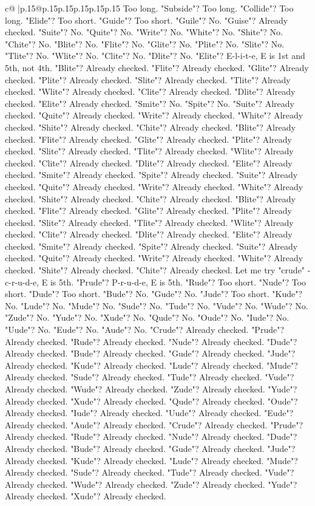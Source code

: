 \documentclass{article}
\begin{document}
{\begin{supertabular}{c@{$\;$}|p{.15\linewidth}@{}p{.15\linewidth}p{.15\linewidth}p{.15\linewidth}p{.15\linewidth}p{.15\linewidth}}
{{{Too long. "Subside"? Too long. "Collide"? Too long. "Elide"? Too short. "Guide"? Too short. "Guile"? No. "Guise"? Already checked. "Suite"? No. "Quite"? No. "Write"? No. "White"? No. "Shite"? No. "Chite"? No. "Blite"? No. "Flite"? No. "Glite"? No. "Plite"? No. "Slite"? No. "Tlite"? No. "Wlite"? No. "Clite"? No. "Dlite"? No. "Elite"? E{-}l{-}i{-}t{-}e, E is 1st and 5th, not 4th. "Blite"? Already checked. "Flite"? Already checked. "Glite"? Already checked. "Plite"? Already checked. "Slite"? Already checked. "Tlite"? Already checked. "Wlite"? Already checked. "Clite"? Already checked. "Dlite"? Already checked. "Elite"? Already checked. "Smite"? No. "Spite"? No. "Suite"? Already checked. "Quite"? Already checked. "Write"? Already checked. "White"? Already checked. "Shite"? Already checked. "Chite"? Already checked. "Blite"? Already checked. "Flite"? Already checked. "Glite"? Already checked. "Plite"? Already checked. "Slite"? Already checked. "Tlite"? Already checked. "Wlite"? Already checked. "Clite"? Already checked. "Dlite"? Already checked. "Elite"? Already checked. "Smite"? Already checked. "Spite"? Already checked. "Suite"? Already checked. "Quite"? Already checked. "Write"? Already checked. "White"? Already checked. "Shite"? Already checked. "Chite"? Already checked. "Blite"? Already checked. "Flite"? Already checked. "Glite"? Already checked. "Plite"? Already checked. "Slite"? Already checked. "Tlite"? Already checked. "Wlite"? Already checked. "Clite"? Already checked. "Dlite"? Already checked. "Elite"? Already checked. "Smite"? Already checked. "Spite"? Already checked. "Suite"? Already checked. "Quite"? Already checked. "Write"? Already checked. "White"? Already checked. "Shite"? Already checked. "Chite"? Already checked. Let me try "crude" {-} c{-}r{-}u{-}d{-}e, E is 5th. "Prude"? P{-}r{-}u{-}d{-}e, E is 5th. "Rude"? Too short. "Nude"? Too short. "Dude"? Too short. "Bude"? No. "Gude"? No. "Jude"? Too short. "Kude"? No. "Lude"? No. "Mude"? No. "Sude"? No. "Tude"? No. "Vude"? No. "Wude"? No. "Zude"? No. "Yude"? No. "Xude"? No. "Qude"? No. "Oude"? No. "Iude"? No. "Uude"? No. "Eude"? No. "Aude"? No. "Crude"? Already checked. "Prude"? Already checked. "Rude"? Already checked. "Nude"? Already checked. "Dude"? Already checked. "Bude"? Already checked. "Gude"? Already checked. "Jude"? Already checked. "Kude"? Already checked. "Lude"? Already checked. "Mude"? Already checked. "Sude"? Already checked. "Tude"? Already checked. "Vude"? Already checked. "Wude"? Already checked. "Zude"? Already checked. "Yude"? Already checked. "Xude"? Already checked. "Qude"? Already checked. "Oude"? Already checked. "Iude"? Already checked. "Uude"? Already checked. "Eude"? Already checked. "Aude"? Already checked. "Crude"? Already checked. "Prude"? Already checked. "Rude"? Already checked. "Nude"? Already checked. "Dude"? Already checked. "Bude"? Already checked. "Gude"? Already checked. "Jude"? Already checked. "Kude"? Already checked. "Lude"? Already checked. "Mude"? Already checked. "Sude"? Already checked. "Tude"? Already checked. "Vude"? Already checked. "Wude"? Already checked. "Zude"? Already checked. "Yude"? Already checked. "Xude"? Already checked. }}}
\end{supertabular}}
\end{document}
